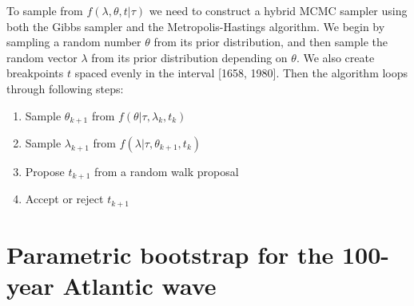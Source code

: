 \documentclass[a4paper]{article}
\begin{document}
To sample from $f(\lambda, \theta, t | \tau)$ we need to construct a hybrid MCMC sampler using both the Gibbs sampler and the Metropolis-Hastings algorithm. We begin by sampling a random number $\theta$ from its prior distribution, and then sample the random vector \textbf{$\lambda$} from its prior distribution depending on $\theta$. We also create breakpoints $t$ spaced evenly in the interval [1658, 1980]. Then the algorithm loops through following steps:
\begin{enumerate}
    \item Sample $\theta_{k+1}$ from $f(\theta|\tau, \lambda_k, t_k)$
    \item Sample $\lambda_{k+1}$ from $f(\lambda|\tau, \theta_{k+1}, t_k)$
    \item Propose $t_{k+1}$ from a random walk proposal
    \item Accept or reject $t_{k+1}$
\end{enumerate}

\newpage

\section{Parametric bootstrap for the 100-year Atlantic wave}
\end{document}
